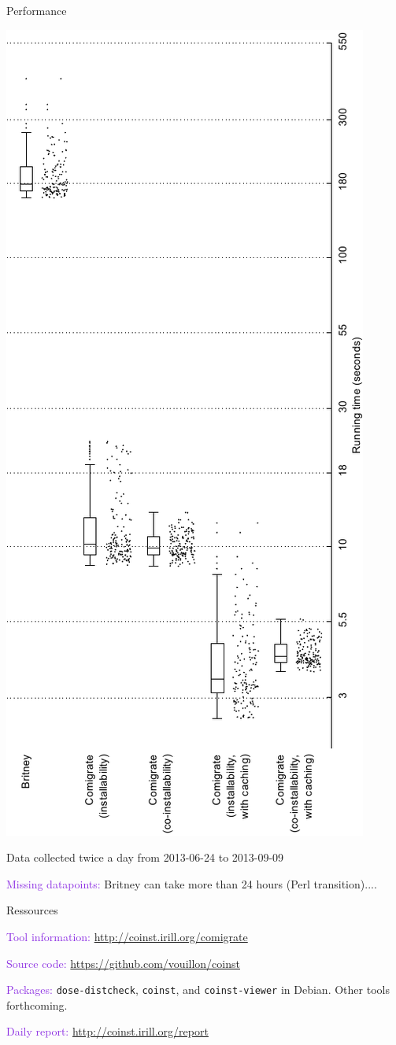 \documentclass[xcolor={dvipsnames}]{beamer}
\newcommand{\EEE}[1]{\textcolor{BlueViolet}{#1}}
\begin{document}
\begin{frame}{Performance}

\includegraphics[height=\linewidth,angle=-90]{performance.pdf}

\vspace{0.8em}

Data collected twice a day from 2013-06-24 to 2013-09-09

\vspace{0.5em}

\EEE{Missing datapoints:} Britney can take more than 24 hours (Perl
transition)....
\end{frame}


\begin{frame}{Ressources}

\EEE{Tool information:} \url{http://coinst.irill.org/comigrate}

\vspace{1em}

\EEE{Source code:} \url{https://github.com/vouillon/coinst}

\vspace{1em}

\EEE{Packages:} \texttt{dose-distcheck}, \texttt{coinst}, and
\texttt{coinst-viewer} in Debian. Other tools forthcoming.

\vspace{1em}

\EEE{Daily report:}
\url{http://coinst.irill.org/report}
\end{frame}
\end{document}
